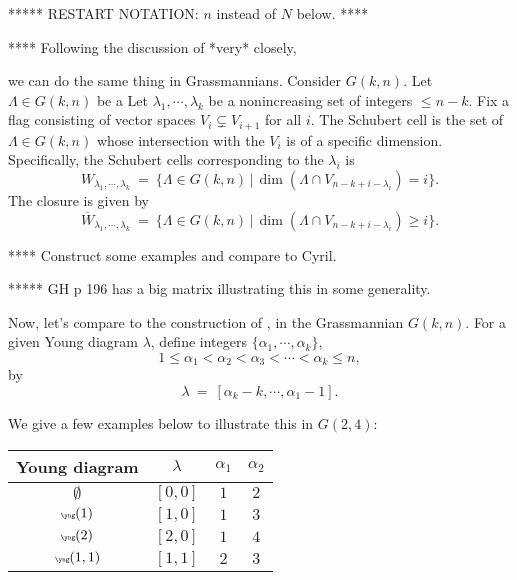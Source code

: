 \documentclass[12pt]{article}
\begin{document}
***** RESTART NOTATION:  $n$ instead of $N$ below. ****

**** Following the discussion of \cite{gh} *very* closely,

we can do the same thing in Grassmannians.
Consider $G(k,n)$.  Let $\Lambda \in G(k,n)$ be a
Let $\lambda_1, \cdots, \lambda_k$ be a nonincreasing set of integers
$\leq n-k$.  
Fix a flag consisting of vector spaces $V_i \subsetneq V_{i+1}$ for all
$i$.  The Schubert cell is the set of $\Lambda \in G(k,n)$ whose intersection
with the $V_i$ is of a specific dimension.
Specifically, the Schubert cells corresponding to the $\lambda_i$ is
\begin{equation}
W_{\lambda_1, \cdots, \lambda_k} \: = \: \{ \Lambda \in G(k,n) \, | \,
\dim \left( \Lambda \cap V_{n-k+i-\lambda_i} \right) = i \}.
\end{equation}
The closure is given by
\begin{equation}
\overline{W}_{\lambda_1, \cdots, \lambda_k} \: = \: \{ \Lambda \in G(k,n) \, | \,
\dim \left( \Lambda \cap V_{n-k+i-\lambda_i} \right) \geq  i \}.
\end{equation}


**** Construct some examples and compare to Cyril.

***** GH p 196 has a big matrix illustrating this in some generality.


Now, let's compare to the construction of \cite[section 3.3.1]{Closset:2023bdr},
in the Grassmannian $G(k,n)$.
For a given Young diagram $\lambda$, define integers 
$\{ \alpha_1, \cdots, \alpha_k \}$,
\begin{equation}
1 \leq \alpha_1 < \alpha_2 < \alpha_3 < \cdots < \alpha_k \leq n,
\end{equation}
by
\begin{equation}
\lambda \: = \: [ \alpha_k - k, \cdots, \alpha_1 - 1].
\end{equation}

We give a few examples below to illustrate this in $G(2,4)$:
\begin{center}
\begin{tabular}{c|c|cc}
Young diagram & $\lambda$ & $\alpha_1$ & $\alpha_2$ \\ \hline
$\emptyset$ & $[0,0]$ & $1$ & $2$ \\
$\tiny\yng(1)$ & $[1,0]$ & $1$ & $3$ \\
$\tiny\yng(2)$ & $[2,0]$ & $1$ & $4$ \\
$\tiny\yng(1,1)$ & $[1,1]$ & $2$ & $3$
\end{tabular}
\end{center}
\end{document}
